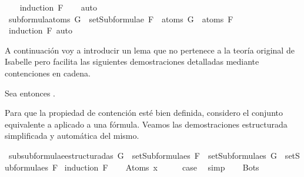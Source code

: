 \begin{isabellebody}
%
\isadelimproof
\ \ %
\endisadelimproof
%
\isatagproof
{}\isamarkupfalse%
\ {\isacharparenleft}induction\ F{\isacharparenright}\isanewline
\ \ \isamarkupfalse%
\ auto\isanewline
\ \isamarkupfalse%
%
\endisatagproof
{\isafoldproof}%
%
\isadelimproof
\isanewline
%
\endisadelimproof
\isanewline
{}\isamarkupfalse%
\ subformula{\isacharunderscore}atoms{\isacharcolon}\ {\isachardoublequoteopen}G\ {\isasymin}\ setSubformulae\ F\ {\isasymLongrightarrow}\ atoms\ G\ {\isasymsubseteq}\ atoms\ F{\isachardoublequoteclose}\isanewline
%
\isadelimproof
\ \ %
\endisadelimproof
%
\isatagproof
{}\isamarkupfalse%
\ {\isacharparenleft}induction\ F{\isacharparenright}\ auto%
\endisatagproof
{\isafoldproof}%
%
\isadelimproof
%
\endisadelimproof
%
\begin{isamarkuptext}%
A continuación voy a introducir un lema que no pertenece a la teoría original de Isabelle pero
facilita las siguientes demostraciones detalladas mediante contenciones en cadena.
\begin{lema}
    Sea  entonces .
  \end{lema} 
Para que la propiedad de contención esté bien definida, considero  el conjunto equivalente
a  aplicado a una fórmula. Veamos las demostraciones estructurada simplificada
y automática del mismo.%
\end{isamarkuptext}\isamarkuptrue%
\isamarkupfalse%
\ subsubformulae{\isacharunderscore}estructurada{\isacharunderscore}s{\isacharcolon}\ {\isachardoublequoteopen}G\ {\isasymin}\ setSubformulae{\isacharunderscore}s\ F\ {\isasymLongrightarrow}\ setSubformulae{\isacharunderscore}s\ G\ {\isasymsubseteq}\ setSubformulae{\isacharunderscore}s\ F{\isachardoublequoteclose}\isanewline
%
\isadelimproof
%
\endisadelimproof
%
\isatagproof
{}\isamarkupfalse%
\ {\isacharparenleft}induction\ F{\isacharparenright}\isanewline
\ \ \isamarkupfalse%
\ {\isacharparenleft}Atom{\isacharunderscore}s\ x{\isacharparenright}\isanewline
\ \ \isamarkupfalse%
\ \isamarkupfalse%
\ {\isacharquery}case\ \isamarkupfalse%
\ simp\isanewline
{}\isamarkupfalse%
\isanewline
\ \ \isamarkupfalse%
\ Bot{\isacharunderscore}s\isanewline

\end{isabellebody}
